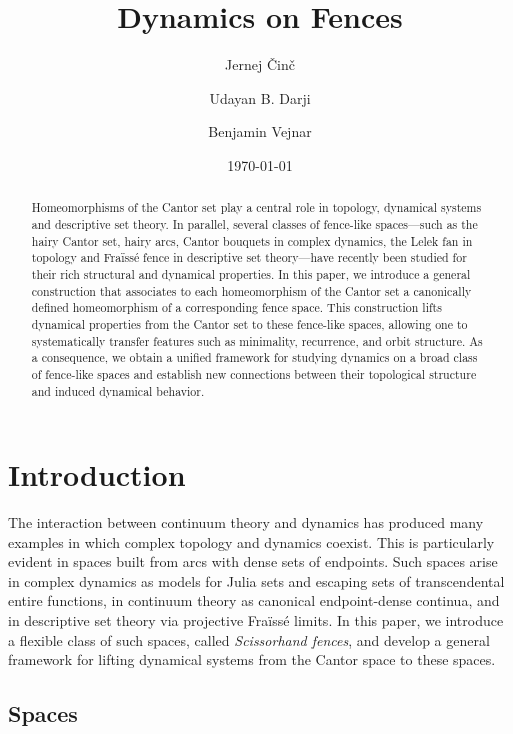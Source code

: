 \documentclass[11pt]{amsart}
\title{Dynamics on Fences}
\author{Jernej \v Cin\v c}
\author{Udayan B. Darji}
\author{Benjamin Vejnar}
\date{\today}
\begin{document}
\begin{abstract}
Homeomorphisms of the Cantor set play a central role in topology, dynamical systems and descriptive set theory. In parallel, several classes of fence-like spaces—such as the hairy Cantor set, hairy arcs, Cantor bouquets in  complex dynamics, the Lelek fan in topology and Fra\"iss\'e fence in descriptive set theory—have recently been studied for their rich structural and dynamical properties.
In this paper, we introduce a general construction that associates to each homeomorphism of the Cantor set a canonically defined homeomorphism of a corresponding fence space. This construction lifts dynamical properties from the Cantor set to these fence-like spaces, allowing one to systematically transfer features such as minimality, recurrence, and orbit structure. As a consequence, we obtain a unified framework for studying dynamics on a broad class of fence-like spaces and establish new connections between their topological structure and induced dynamical behavior.
\end{abstract}

\maketitle

\tableofcontents
\section{Introduction}

The interaction between continuum theory and dynamics has produced many examples in which complex topology and dynamics coexist. This is particularly evident in spaces built from arcs with dense sets of endpoints. Such spaces arise in complex dynamics as models for Julia sets and escaping sets of transcendental entire functions, in continuum theory as canonical endpoint-dense continua, and in descriptive set theory via projective Fra\"iss\'e limits. In this paper, we introduce a flexible class of such spaces, called \emph{Scissorhand fences}, and develop a general framework for lifting dynamical systems from the Cantor space to these spaces.

\subsection{Spaces}
\end{document}
